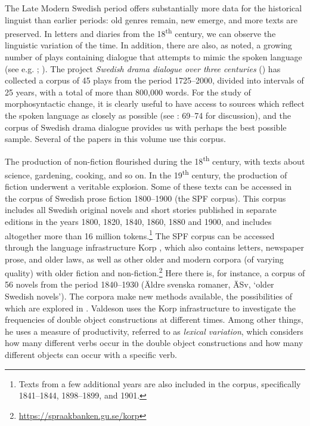 \documentclass[output=paper]{langscibook}
\begin{document}
The Late Modern Swedish period offers substantially more data for the historical linguist than earlier periods: old genres remain, new emerge, and more texts are preserved. In letters and diaries from the 18\textsuperscript{th} century, we can observe the linguistic variation of the time. In addition, there are also, as noted, a growing number of plays containing dialogue that attempts to mimic the spoken language (see e.g. \citealt{Widmark1970,Widmark2000}; \citealt{Thelander2007}). The project \textit{Swedish drama dialogue over three centuries} (\citealt{MarttalaStromquist2001}) has collected a corpus of 45 plays from the period 1725–2000, divided into intervals of 25 years, with a total of more than 800,000 words. For the study of morphosyntactic change, it is clearly useful to have access to sources which reflect the spoken language as closely as possible (see \citealt{Magnusson2007}: 69–74 for discussion), and the corpus of Swedish drama dialogue provides us with perhaps the best possible sample. Several of the papers in this volume use this corpus.



The production of non-fiction flourished during the 18\textsuperscript{th} century, with texts about science, gardening, cooking, and so on. In the 19\textsuperscript{th} century, the production of fiction underwent a veritable explosion. Some of these texts can be accessed in the corpus of Swedish prose fiction 1800–1900 (the SPF corpus). This corpus includes all Swedish original novels and short stories published in separate editions in the years 1800, 1820, 1840, 1860, 1880 and 1900, and includes altogether more than 16 million tokens.\footnote{Texts from a few additional years are also included in the corpus, specifically 1841–1844, 1898–1899, and 1901.}  The SPF corpus can be accessed through the language infrastructure Korp \citep{BorinEtAl2012}, which also contains letters, newspaper prose, and older laws, as well as other older and modern corpora (of varying quality) with older fiction and non-fiction.\footnote{\url{https://spraakbanken.gu.se/korp}}  Here there is, for instance, a corpus of 56 novels from the period 1840–1930 (Äldre svenska romaner, ÄSv, ‘older Swedish novels’). The corpora make new methods available, the possibilities of which are explored in . Valdeson uses the Korp infrastructure to investigate the frequencies of double object constructions at different times. Among other things, he uses a measure of productivity, referred to as \textit{lexical variation}, which considers how many different verbs occur in the double object constructions and how many different objects can occur with a specific verb.
\end{document}
